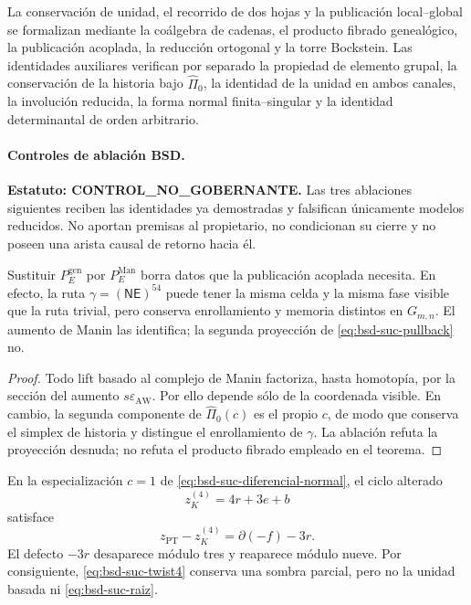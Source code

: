 La conservación de unidad, el recorrido de dos hojas y la publicación
local--global se formalizan mediante la coálgebra de cadenas, el producto
fibrado genealógico, la publicación acoplada, la reducción ortogonal y la
torre Bockstein. Las identidades auxiliares verifican por separado la propiedad de elemento grupal,
la conservación de la historia bajo \(\widehat\Pi_0\), la identidad de la
unidad en ambos canales, la involución reducida, la forma normal
finita--singular y la identidad determinantal de orden arbitrario.

\paragraph{Controles de ablación BSD.}
\noindent\textbf{Estatuto: CONTROL\_NO\_GOBERNANTE.}
Las tres ablaciones siguientes reciben las identidades ya demostradas y
falsifican únicamente modelos reducidos. No aportan premisas al propietario,
no condicionan su cierre y no poseen una arista causal de retorno hacia él.

\begin{ablation}
\label{abl:bsd-suc-manin}
Sustituir \(P_E^{\mathrm{gen}}\) por \(P_E^{\mathrm{Man}}\) borra datos que
la publicación acoplada necesita. En efecto, la ruta
\(\gamma=(\mathsf N\mathsf E)^{54}\) puede tener la misma celda y la misma
fase visible que la ruta trivial, pero conserva enrollamiento y memoria
distintos en \(G_{m,n}\). El aumento de Manin las identifica; la segunda
proyección de \eqref{eq:bsd-suc-pullback} no.
\end{ablation}

\begin{proof}
Todo lift basado al complejo de Manin factoriza, hasta homotopía, por la
sección del aumento \(s\varepsilon_{\mathrm{AW}}\). Por ello depende sólo
de la coordenada visible. En cambio, la segunda componente de
\(\widehat\Pi_0(c)\) es el propio \(c\), de modo que conserva el simplex de
historia y distingue el enrollamiento de \(\gamma\). La ablación refuta la
proyección desnuda; no refuta el producto fibrado empleado en el teorema.
\end{proof}

\begin{ablation}
\label{abl:bsd-suc-twist}
En la especialización \(c=1\) de
\eqref{eq:bsd-suc-diferencial-normal}, el ciclo alterado
\begin{equation}\label{eq:bsd-suc-twist4}
 z_K^{(4)}=4r+3e+b
\end{equation}
satisface
\begin{equation}\label{eq:bsd-suc-twist-defecto}
 z_{\mathrm{PT}}-z_K^{(4)}
 =\partial(-f)-3r.
\end{equation}
El defecto \(-3r\) desaparece módulo tres y reaparece módulo nueve. Por
consiguiente, \eqref{eq:bsd-suc-twist4} conserva una sombra parcial, pero no
la unidad basada ni \eqref{eq:bsd-suc-raiz}.
\end{ablation}

